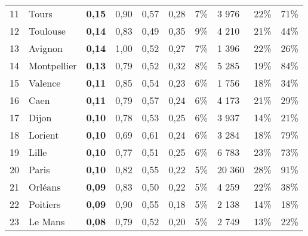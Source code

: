 \begin{longtable}{p{0.5cm}p{4cm}p{0.5cm}p{0.5cm}p{0.5cm}p{0.5cm}p{1cm}p{1cm}p{1cm}p{1cm}}
    \small{11} & \small{Tours} & \small{\textbf{0,15}} & \small{0,90} & \small{0,57} & \small{0,28} & \small{7\%} & \small{3 976} & \small{22\%} & \small{71\%}\\
    \small{12} & \small{Toulouse} & \small{\textbf{0,14}} & \small{0,83} & \small{0,49} & \small{0,35} & \small{9\%} & \small{4 210} & \small{21\%} & \small{44\%}\\
    \small{13} & \small{Avignon} & \small{\textbf{0,14}} & \small{1,00} & \small{0,52} & \small{0,27} & \small{7\%} & \small{1 396} & \small{22\%} & \small{26\%}\\
    \small{14} & \small{Montpellier} & \small{\textbf{0,13}} & \small{0,79} & \small{0,52} & \small{0,32} & \small{8\%} & \small{5 285} & \small{19\%} & \small{84\%}\\
    \small{15} & \small{Valence} & \small{\textbf{0,11}} & \small{0,85} & \small{0,54} & \small{0,23} & \small{6\%} & \small{1 756} & \small{18\%} & \small{34\%}\\
    \small{16} & \small{Caen} & \small{\textbf{0,11}} & \small{0,79} & \small{0,57} & \small{0,24} & \small{6\%} & \small{4 173} & \small{21\%} & \small{29\%}\\
    \small{17} & \small{Dijon} & \small{\textbf{0,10}} & \small{0,78} & \small{0,53} & \small{0,25} & \small{6\%} & \small{3 937} & \small{14\%} & \small{21\%}\\
    \small{18} & \small{Lorient} & \small{\textbf{0,10}} & \small{0,69} & \small{0,61} & \small{0,24} & \small{6\%} & \small{3 284} & \small{18\%} & \small{79\%}\\
    \small{19} & \small{Lille} & \small{\textbf{0,10}} & \small{0,77} & \small{0,51} & \small{0,25} & \small{6\%} & \small{6 783} & \small{23\%} & \small{73\%}\\
    \small{20} & \small{Paris} & \small{\textbf{0,10}} & \small{0,82} & \small{0,55} & \small{0,22} & \small{5\%} & \small{20 360} & \small{28\%} & \small{91\%}\\
    \small{21} & \small{Orléans} & \small{\textbf{0,09}} & \small{0,83} & \small{0,50} & \small{0,22} & \small{5\%} & \small{4 259} & \small{22\%} & \small{38\%}\\
    \small{22} & \small{Poitiers} & \small{\textbf{0,09}} & \small{0,90} & \small{0,55} & \small{0,18} & \small{5\%} & \small{2 138} & \small{14\%} & \small{18\%}\\
    \small{23} & \small{Le Mans} & \small{\textbf{0,08}} & \small{0,79} & \small{0,52} & \small{0,20} & \small{5\%} & \small{2 749} & \small{13\%} & \small{22\%}\\

\end{longtable}
